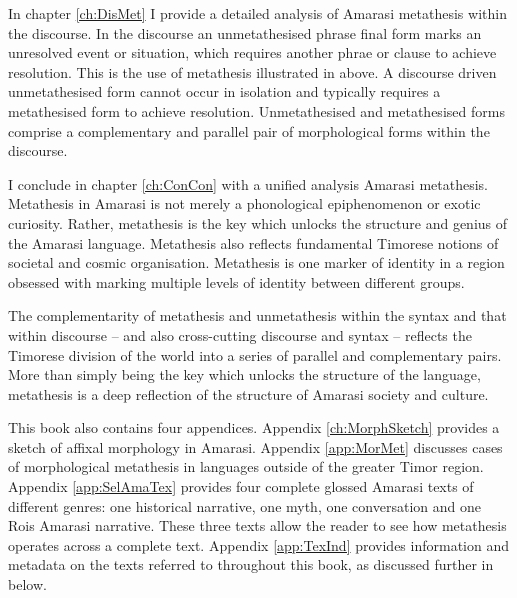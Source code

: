 In  chapter \ref{ch:DisMet} I provide a detailed analysis of Amarasi metathesis within the discourse.
In the discourse an unmetathesised phrase final form marks an unresolved event or situation,
which requires another phrae or clause to achieve resolution.
This is the use of metathesis illustrated in  above.
A discourse driven unmetathesised form cannot occur in isolation
and typically requires a metathesised form to achieve resolution.
Unmetathesised and metathesised forms comprise a complementary and
parallel pair of morphological forms within the discourse.

I conclude in chapter \ref{ch:ConCon} with a unified analysis Amarasi metathesis.
Metathesis in Amarasi is not merely a phonological epiphenomenon or exotic curiosity.
Rather, metathesis is the key which unlocks the structure and genius of the Amarasi language.
Metathesis also reflects fundamental Timorese notions of societal and cosmic organisation.
Metathesis is one marker of identity in a region obsessed with marking multiple
levels of identity between different groups.

The complementarity of metathesis and unmetathesis within the syntax and that within discourse
-- and also cross-cutting discourse and syntax --
reflects the Timorese division of the world into a series of parallel and complementary pairs.
More than simply being the key which unlocks the structure of the language,
metathesis is a deep reflection of the structure of Amarasi society and culture.

This book also contains four appendices.
Appendix \ref{ch:MorphSketch} provides a sketch of affixal morphology in Amarasi.
Appendix \ref{app:MorMet} discusses cases of morphological metathesis
in languages outside of the greater Timor region.
Appendix \ref{app:SelAmaTex} provides four complete
glossed Amarasi texts of different genres:
one historical narrative, one myth, one conversation
and one Ro{\Q}is Amarasi narrative.
These three texts allow the reader to see
how metathesis operates across a complete text.
Appendix \ref{app:TexInd} provides information and metadata
on the texts referred to throughout this book,
as discussed further in  below.







